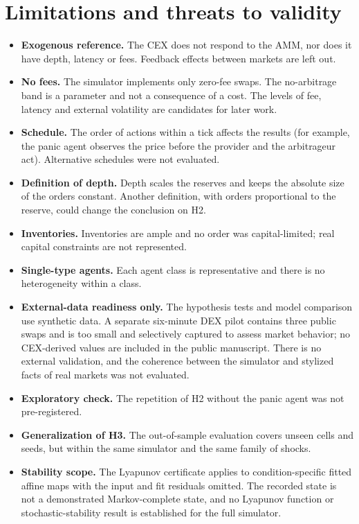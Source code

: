 \section{Limitations and threats to validity}

\begin{itemize}
  \item \textbf{Exogenous reference.} The CEX does not respond to the AMM, nor does it have depth, latency or fees. Feedback effects between markets are left out.
  \item \textbf{No fees.} The simulator implements only zero-fee swaps. The no-arbitrage band is a parameter and not a consequence of a cost. The levels of fee, latency and external volatility are candidates for later work.
  \item \textbf{Schedule.} The order of actions within a tick affects the results (for example, the panic agent observes the price before the provider and the arbitrageur act). Alternative schedules were not evaluated.
  \item \textbf{Definition of depth.} Depth scales the reserves and keeps the absolute size of the orders constant. Another definition, with orders proportional to the reserve, could change the conclusion on H2.
  \item \textbf{Inventories.} Inventories are ample and no order was capital-limited; real capital constraints are not represented.
  \item \textbf{Single-type agents.} Each agent class is representative and there is no heterogeneity within a class.
  \item \textbf{External-data readiness only.} The hypothesis tests and model comparison use synthetic data. A separate six-minute DEX pilot contains three public swaps and is too small and selectively captured to assess market behavior; no CEX-derived values are included in the public manuscript. There is no external validation, and the coherence between the simulator and stylized facts of real markets was not evaluated.
  \item \textbf{Exploratory check.} The repetition of H2 without the panic agent was not pre-registered.
  \item \textbf{Generalization of H3.} The out-of-sample evaluation covers unseen cells and seeds, but within the same simulator and the same family of shocks.
  \item \textbf{Stability scope.} The Lyapunov certificate applies to condition-specific fitted affine maps with the input and fit residuals omitted. The recorded state is not a demonstrated Markov-complete state, and no Lyapunov function or stochastic-stability result is established for the full simulator.
\end{itemize}
